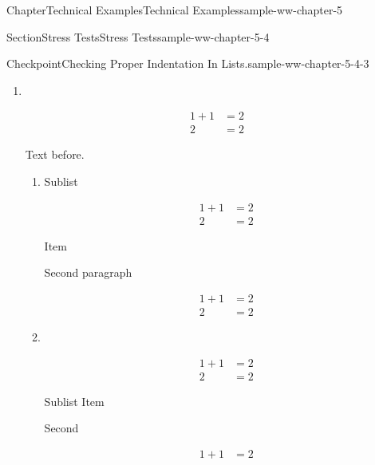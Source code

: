 \documentclass[oneside,10pt,]{book}
\numberwithin{equation}{section}
\newcommand{\amp}{&}
\begin{document}
\begin{chapterptx}{Chapter}{Technical Examples}{}{Technical Examples}{}{}{sample-ww-chapter-5}
\begin{sectionptx}{Section}{Stress Tests}{}{Stress Tests}{}{}{sample-ww-chapter-5-4}
\begin{inlineexercise}{Checkpoint}{Checking Proper Indentation In Lists.}{sample-ww-chapter-5-4-3}
\begin{enumerate}[label={\alph*.}]
\begin{equation*}
\begin{aligned}
2\amp=2
\end{aligned}
\end{equation*}
%
\par
item%
\par
Second paragraph%
\par
%
\begin{equation*}
\begin{aligned}
1+1\amp=2\\
2\amp=2
\end{aligned}
\end{equation*}
%
\item{}~%
\par
%
\begin{equation*}
\begin{aligned}
1+1\amp=2\\
2\amp=2
\end{aligned}
\end{equation*}
%
\par
Text before.%
\begin{enumerate}[label={\roman*.}]
\item{}Sublist%
\par
%
\begin{equation*}
\begin{aligned}
1+1\amp=2\\
2\amp=2
\end{aligned}
\end{equation*}
%
\par
Item%
\par
Second paragraph%
\par
%
\begin{equation*}
\begin{aligned}
1+1\amp=2\\
2\amp=2
\end{aligned}
\end{equation*}
%
\item{}~%
\par
%
\begin{equation*}
\begin{aligned}
1+1\amp=2\\
2\amp=2
\end{aligned}
\end{equation*}
%
\par
Sublist Item%
\par
Second%
\par
%
\begin{equation*}
\begin{aligned}
1+1\amp=2\\

\end{aligned}
\end{equation*}
\end{enumerate}
\end{enumerate}
\end{inlineexercise}
\end{sectionptx}
\end{chapterptx}
\end{document}
